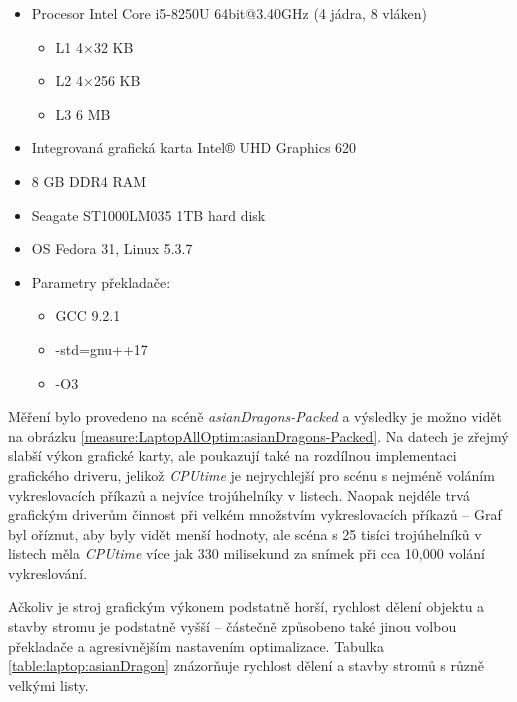 \documentclass[report,11pt]{elsarticle}
\begin{document}
\begin{itemize}
    \item Procesor Intel Core i5-8250U 64bit@3.40GHz (4 jádra, 8 vláken)
    \begin{itemize}
        \item L1 4$\times$32 KB
        \item L2 4$\times$256 KB
        \item L3 6 MB
    \end{itemize}
    \item Integrovaná grafická karta Intel® UHD Graphics 620
    \item 8 GB DDR4 RAM
    \item Seagate ST1000LM035 1TB hard disk
    \item OS Fedora 31, Linux 5.3.7
    \item Parametry překladače:
    \begin{itemize}
        \item GCC 9.2.1
        \item -std=gnu++17
        \item -O3
    \end{itemize}
\end{itemize}

Měření bylo provedeno na scéně \textit{asianDragons-Packed} a výsledky je možno
vidět na obrázku \ref{measure:LaptopAllOptim:asianDragons-Packed}. Na datech
je zřejmý slabší výkon grafické karty, ale poukazují také na rozdílnou implementaci
grafického driveru, jelikož \textit{CPUtime} je nejrychlejší pro scénu s nejméně
voláním vykreslovacích příkazů a nejvíce trojúhelníky v listech. Naopak nejdéle
trvá grafickým driverům činnost při velkém množstvím vykreslovacích příkazů --
Graf byl oříznut, aby byly vidět menší hodnoty, ale scéna s 25 tisíci trojúhelníků
v listech měla \textit{CPUtime} více jak 330 milisekund za snímek při cca 10,000
volání vykreslování.

Ačkoliv je stroj grafickým výkonem podstatně horší, rychlost dělení objektu a
stavby stromu je podstatně vyšší -- částečně způsobeno také jinou volbou překladače
a agresivnějším nastavením optimalizace. Tabulka \ref{table:laptop:asianDragon}
znázorňuje rychlost dělení a stavby stromů s různě velkými listy.
\end{document}

